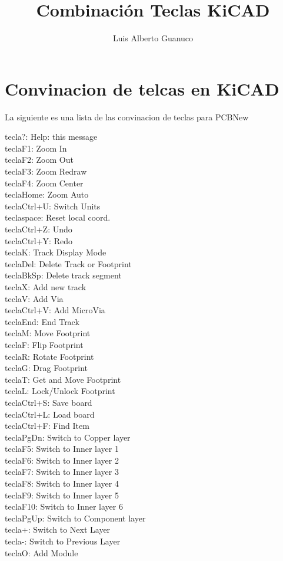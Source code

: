 \documentclass[11pt,a4paper,twocolomn]{article}
\author{Luis Alberto Guanuco}
\title{Combinación Teclas KiCAD}
\begin{document}
\maketitle
\section[twocolomn]{Convinacion de telcas en KiCAD}
La siguiente es una lista de las convinacion de teclas para PCBNew
\begin{multicols}{2}

tecla?:    Help: this message\\
teclaF1:    Zoom In\\
teclaF2:    Zoom Out\\
teclaF3:    Zoom Redraw\\
teclaF4:    Zoom Center\\
teclaHome:    Zoom Auto\\
teclaCtrl+U:    Switch Units\\
teclaspace:    Reset local coord.\\
teclaCtrl+Z:    Undo\\
teclaCtrl+Y:    Redo\\
teclaK:    Track Display Mode\\
teclaDel:    Delete Track or Footprint\\
teclaBkSp:    Delete track segment\\
teclaX:    Add new track\\
teclaV:    Add Via\\
teclaCtrl+V:    Add MicroVia\\
teclaEnd:    End Track\\
teclaM:    Move Footprint\\
teclaF:    Flip Footprint\\
teclaR:    Rotate Footprint\\
teclaG:    Drag Footprint\\
teclaT:    Get and Move Footprint\\
teclaL:    Lock/Unlock Footprint\\
teclaCtrl+S:    Save board\\
teclaCtrl+L:    Load board\\
teclaCtrl+F:    Find Item\\
teclaPgDn:    Switch to Copper layer\\
teclaF5:    Switch to Inner layer 1\\
teclaF6:    Switch to Inner layer 2\\
teclaF7:    Switch to Inner layer 3\\
teclaF8:    Switch to Inner layer 4\\
teclaF9:    Switch to Inner layer 5\\
teclaF10:    Switch to Inner layer 6\\
teclaPgUp:    Switch to Component layer\\
tecla+:    Switch to Next Layer\\
tecla-:    Switch to Previous Layer\\
teclaO:    Add Module\\
\end{multicols}
\end{document}
